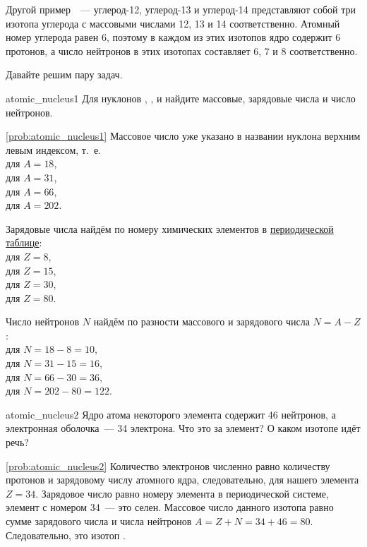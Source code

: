 Другой пример~~--- углерод-12, углерод-13 и углерод-14 представляют собой три изотопа углерода с массовыми числами 12, 13 и 14 соответственно. Атомный номер углерода равен 6, поэтому в каждом из этих изотопов ядро содержит 6 протонов, а число нейтронов в этих изотопах составляет 6, 7 и 8 соответственно.

Давайте решим пару задач.

\begin{problem}{}{atomic_nucleus1}
    Для нуклонов , ,  и  найдите массовые, зарядовые числа и число нейтронов.

    \begin{sol}{\ref{prob:atomic_nucleus1}}
        Массовое число уже указано в названии нуклона верхним левым индексом, т.~е.\\
        для  $A = 18$,\\
        для  $A = 31$,\\
        для  $A = 66$,\\
        для  $A = 202$.

        Зарядовые числа найдём по номеру химических элементов в \hyperref[appendix:periodic_table]{периодической таблице}:\\
        для  $Z = 8$,\\
        для  $Z = 15$,\\
        для  $Z = 30$,\\
        для  $Z = 80$.

        Число нейтронов $N$ найдём по разности массового и зарядового числа $N = A - Z$:\\
        для  $N = 18 - 8 = 10$,\\
        для  $N = 31 - 15 = 16$,\\
        для  $N = 66 - 30 = 36$,\\
        для  $N = 202 - 80 = 122$.
    \end{sol}
\end{problem}

\begin{problem}{}{atomic_nucleus2}
    Ядро атома некоторого элемента содержит 46 нейтронов, а электронная оболочка~--- 34 электрона. Что это за элемент? О каком изотопе идёт речь?

    \begin{sol}{\ref{prob:atomic_nucleus2}}
        Количество электронов численно равно количеству протонов и зарядовому числу атомного ядра, следовательно, для нашего элемента $Z = 34$. Зарядовое число равно номеру элемента в периодической системе, элемент с номером 34~--- это селен. Массовое число данного изотопа равно сумме зарядового числа и числа нейтронов $A = Z + N = 34 + 46 = 80$. Следовательно, это изотоп .
    \end{sol}
\end{problem}

